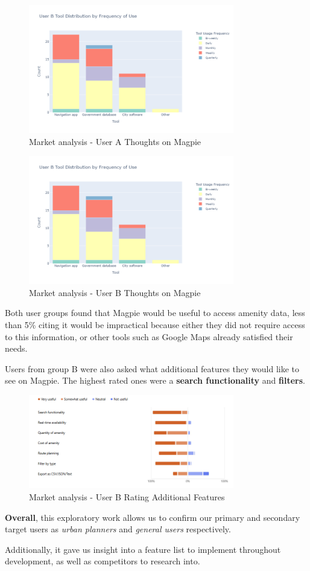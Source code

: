 \documentclass[preview]{standalone}
\begin{document}
\begin{figure}[htbp]
    \centering{}
    \includegraphics[width=0.8\textwidth]{images/mr-userb-tool-freq.png}
    \caption{Market analysis - User A Thoughts on Magpie}
\end{figure}

\begin{figure}[htbp]
    \centering{}
    \includegraphics[width=0.8\textwidth]{images/mr-userb-tool-freq.png}
    \caption{Market analysis - User B Thoughts on Magpie}
\end{figure}

Both user groups found that Magpie would be useful to access amenity data, less
than 5\% citing it would be impractical because either they did not require
access to this information, or other tools such as Google Maps already satisfied
their needs.

Users from group B were also asked what additional features they would like to
see on Magpie. The highest rated ones were a \textbf{search functionality} and
\textbf{filters}.

\begin{figure}[htbp]
    \centering{}
    \includegraphics[width=0.8\textwidth]{images/mr-extra-features.png}
    \caption{Market analysis - User B Rating Additional Features}
\end{figure}

\textbf{Overall}, this exploratory work allows us to confirm our primary and
secondary target users as \emph{urban planners} and \emph{general users}
respectively.

Additionally, it gave us insight into a feature list to implement throughout
development, as well as competitors to research into.
\end{document}
